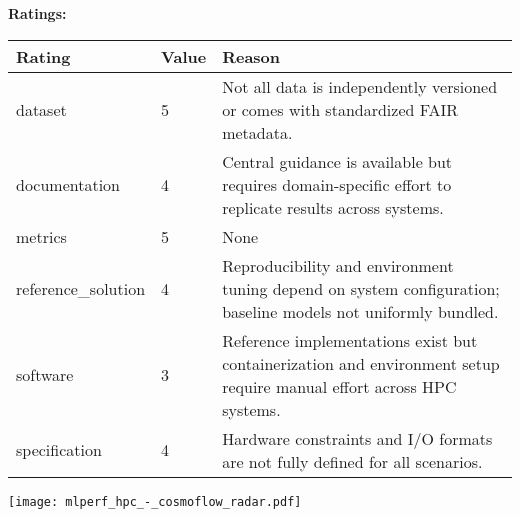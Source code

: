 {{{\bf Ratings:} ~ \\

\begin{tabular}{p{} p{} p{}}
\hline
Rating & Value & Reason \\
\hline
dataset & 5 & Not all data is independently versioned or comes with standardized FAIR metadata.
 \\
documentation & 4 & Central guidance is available but requires domain-specific effort to replicate results across systems.
 \\
metrics & 5 & None
 \\
reference\_solution & 4 & Reproducibility and environment tuning depend on system configuration; baseline models not uniformly bundled.
 \\
software & 3 & Reference implementations exist but containerization and environment setup require manual effort across HPC systems.
 \\
specification & 4 & Hardware constraints and I/O formats are not fully defined for all scenarios.
 \\
\hline
\end{tabular}

\texttt{[image: mlperf\_hpc\_-\_cosmoflow\_radar.pdf]}
}}
\clearpage